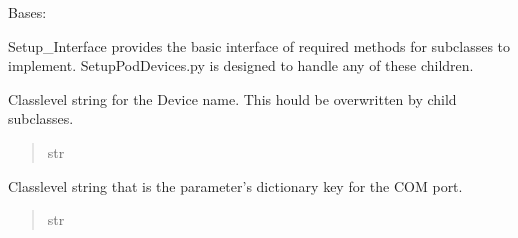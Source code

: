 \documentclass[letterpaper,10pt,english]{sphinxmanual}
\begin{document}
\begin{fulllineitems}
\label{\detokenize{Setup_PodInterface:Setup_PodInterface.Setup_Interface}}
\pysigstartsignatures
{}
\pysigstopsignatures
\sphinxAtStartPar
Bases: 

\sphinxAtStartPar
Setup\_Interface provides the basic interface of required methods for subclasses to implement.     SetupPodDevices.py is designed to handle any of these children.

\begin{fulllineitems}
\label{\detokenize{Setup_PodInterface:Setup_PodInterface.Setup_Interface._NAME}}
\pysigstartsignatures
{}
\pysigstopsignatures
\sphinxAtStartPar
Class\sphinxhyphen{}level string for the Device name. This hould be overwritten by child             subclasses.
\begin{quote}\begin{description}
\sphinxAtStartPar
str

\end{description}\end{quote}

\end{fulllineitems}


\begin{fulllineitems}
\label{\detokenize{Setup_PodInterface:Setup_PodInterface.Setup_Interface._PORTKEY}}
\pysigstartsignatures
{}
\pysigstopsignatures
\sphinxAtStartPar
Class\sphinxhyphen{}level string that is the parameter’s dictionary key for the COM port.
\begin{quote}\begin{description}
\sphinxAtStartPar
str

\end{description}\end{quote}

\end{fulllineitems}


\end{fulllineitems}
\end{document}
